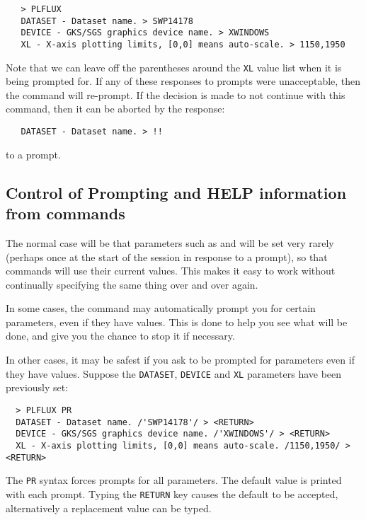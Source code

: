 \begin{verbatim}
   > PLFLUX
   DATASET - Dataset name. > SWP14178
   DEVICE - GKS/SGS graphics device name. > XWINDOWS
   XL - X-axis plotting limits, [0,0] means auto-scale. > 1150,1950
\end{verbatim}

Note that we can leave off the parentheses around the \verb+XL+ value list
when it is being prompted for.  If any of these responses to prompts were
unacceptable, then the command will re-prompt.  If the decision is made to not
continue with this command, then it can be aborted by the response:

\begin{verbatim}
   DATASET - Dataset name. > !!
\end{verbatim}

to a prompt.


\subsection{Control of Prompting and HELP information from commands}

The normal case will be that parameters such as 
 and
 will be set very rarely (perhaps once at the start of the session
in response to a prompt), so that commands will use their current values.  This
makes it easy to work without continually specifying the same thing over and
over again.

In some cases, the command may automatically prompt you for certain
parameters, even if they have values.  This is done to help you see what will
be done, and give you the chance to stop it if necessary.

In other cases, it may be safest if you ask to be prompted for parameters
even if they have values.  Suppose the \verb+DATASET+, \verb+DEVICE+ and
\verb+XL+ parameters have been previously set:

\begin{verbatim}
  > PLFLUX PR
  DATASET - Dataset name. /'SWP14178'/ > <RETURN>
  DEVICE - GKS/SGS graphics device name. /'XWINDOWS'/ > <RETURN>
  XL - X-axis plotting limits, [0,0] means auto-scale. /1150,1950/ > <RETURN>
\end{verbatim}

The \verb+PR+ syntax forces prompts for all parameters.  The default value is
printed with each prompt.  Typing the \verb+RETURN+ key causes the default to be
accepted, alternatively a replacement value can be typed.


